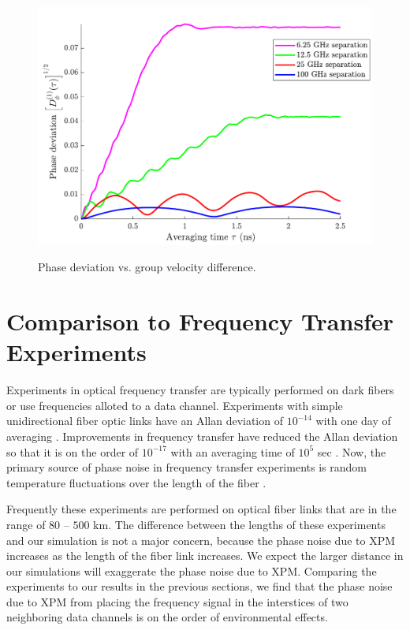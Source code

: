 \begin{figure}[htb]
	\raggedright
	\includegraphics[scale=0.8]{img/GVPhaseStability}
	\renewcommand{\baselinestretch}{1}
	\small\normalsize
	\begin{quote}
		\caption{Phase deviation vs. group velocity difference.} \label{fig:GVPhaseStability}
	\end{quote}
\end{figure}
\renewcommand{\baselinestretch}{2}
\small\normalsize

\section{Comparison to Frequency Transfer Experiments}

Experiments in optical frequency transfer are typically performed on dark fibers or use frequencies alloted to a data channel. Experiments with simple unidirectional fiber optic links have an Allan deviation of $10^{-14}$ with one day of averaging \cite{UniExperiment1, UniExperiment2, UniExperiment3}. Improvements in frequency transfer have reduced the Allan deviation so that it is on the order of $10^{-17}$ with an averaging time of $10^5$ sec \cite{UniExperiment2,Experiment1}. Now, the primary source of phase noise in frequency transfer experiments is random temperature fluctuations over the length of the fiber \cite{TempExperiments}. 

Frequently these experiments are performed on optical fiber links that are in the range of $80$ -- $500$ km. The difference between the lengths of these experiments and our simulation is not a major concern, because the phase noise due to XPM increases as the length of the fiber link increases. We expect the larger distance in our simulations will exaggerate the phase noise due to XPM. Comparing the experiments to our results in the previous sections, we find that the phase noise due to XPM from placing the frequency signal in the interstices of two neighboring data channels is on the order of environmental effects.

